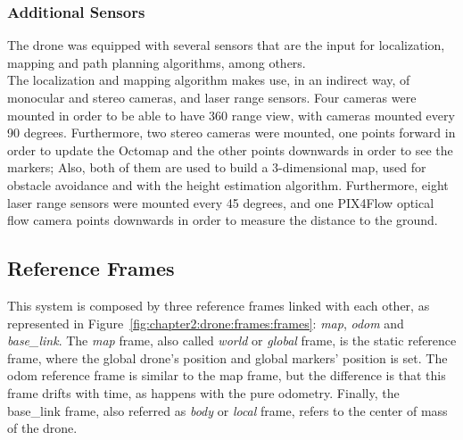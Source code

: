 \subsubsection{Additional Sensors}
The drone was equipped with several sensors that are the input for localization, mapping and path planning algorithms, among others.\\

The localization and mapping algorithm makes use, in an indirect way, of monocular and stereo cameras, and laser range sensors. Four cameras were mounted in order to be able to have 360 range view, with cameras mounted every 90 degrees. Furthermore, two stereo cameras were mounted, one points forward in order to update the Octomap and the other points downwards in order to see the markers; Also, both of them are used to build a 3-dimensional map, used for obstacle avoidance and with the height estimation algorithm. Furthermore, eight laser range sensors were mounted every 45 degrees, and one PIX4Flow optical flow camera points downwards in order to measure the distance to the ground.

\subsection{Reference Frames}
\label{subsec:chapter2:drone:frames}
This system is composed by three reference frames linked with each other, as represented in Figure~\ref{fig:chapter2:drone:frames:frames}: \emph{map}, \emph{odom} and \emph{base\_link}. The \emph{map} frame, also called \emph{world} or \emph{global} frame, is the static reference frame, where the global drone's position and global markers' position is set. The odom reference frame is similar to the map frame, but the difference is that this frame drifts with time, as happens with the pure odometry. Finally, the base\_link frame, also referred as \emph{body} or \emph{local} frame, refers to the center of mass of the drone.\\

